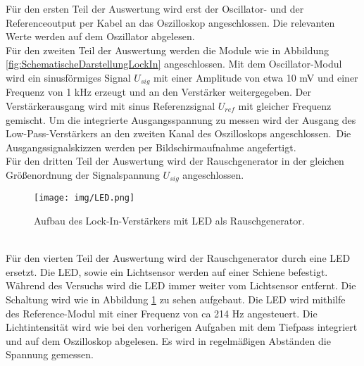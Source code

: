 Für den ersten Teil der Auswertung wird erst der Oscillator- und der Referenceoutput per Kabel an das Oszilloskop angeschlossen. 
Die relevanten Werte werden auf dem Oszillator abgelesen.\\
Für den zweiten Teil der Auswertung werden die Module wie in Abbildung \ref{fig:SchematischeDarstellungLockIn} angeschlossen.
Mit dem Oscillator-Modul wird ein sinusförmiges Signal $U_{sig}$ mit einer Amplitude von etwa 10 mV und einer Frequenz von 1 kHz erzeugt
und an den Verstärker weitergegeben. Der Verstärkerausgang wird mit sinus Referenzsignal $U_{ref}$ mit gleicher Frequenz gemischt.
Um die integrierte Ausgangsspannung zu messen wird der Ausgang des Low-Pass-Verstärkers an den zweiten Kanal des Oszilloskops angeschlossen.\
Die Ausgangssignalskizzen werden per Bildschirmaufnahme angefertigt.\\
Für den dritten Teil der Auswertung wird der Rauschgenerator in der gleichen Größenordnung der Signalspannung $U_{sig}$ angeschlossen.\\
\begin{figure}
    \centering
    \texttt{[image: img/LED.png]}
    \caption{Aufbau des Lock-In-Verstärkers mit LED als Rauschgenerator.\cite{V303}}
    \label{fig:LED}
\end{figure}
\\
Für den vierten Teil der Auswertung wird der Rauschgenerator durch eine LED ersetzt. 
Die LED, sowie ein Lichtsensor werden auf einer Schiene befestigt. Während des Versuchs wird die LED immer weiter vom 
Lichtsensor entfernt.
Die Schaltung wird wie in Abbildung \ref{fig:LED} zu sehen aufgebaut.
Die LED wird mithilfe des Reference-Modul mit einer Frequenz von ca 214 Hz angesteuert.
Die Lichtintensität wird wie bei den vorherigen Aufgaben mit dem Tiefpass integriert und auf dem Oszilloskop abgelesen.
Es wird in regelmäßigen Abständen die Spannung gemessen.\\